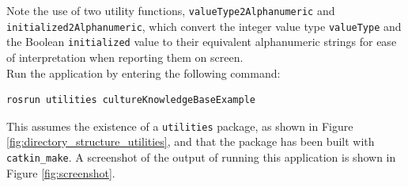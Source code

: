 \documentclass{CSSRforAfrica}
\begin{document}
Note the use of two utility functions, {\footnotesize \tt valueType2Alphanumeric} and {\footnotesize \tt initialized2Alphanumeric}, which convert the integer value type {\footnotesize \tt valueType}   and the Boolean   {\footnotesize \tt initialized}  value to their  equivalent alphanumeric strings for ease of interpretation when reporting them on screen.
~\\
Run the application by entering the following command:
\begin{lstlisting}[style=withoutNumbering, language=bash]
rosrun utilities cultureKnowledgeBaseExample
\end{lstlisting}
This assumes the existence of a {\small \tt utilities} package, as shown in Figure \ref{fig:directory_structure_utilities}, and that the package has been built with {\small \tt catkin\_make}.  
A screenshot of the output of running this application is shown in Figure \ref{fig:screenshot}.
\end{document}
